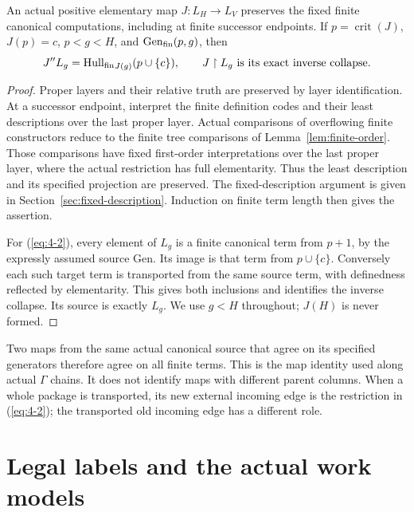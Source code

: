 \begin{lemma}\label{lem:transport}
An actual positive elementary map $J:L_H\to L_V$ preserves the fixed
finite canonical computations, including at finite successor endpoints.
If $p=\operatorname{crit}(J)$, $J(p)=c$, $p<g<H$, and $\operatorname{Gen_{fin}}(p,g)$,
then
\begin{equation}\label{eq:4-2}
 J''L_g=\operatorname{Hull_{fin}}_{J(g)}(p\cup\{c\}),
 \qquad J\restriction L_g\text{ is its exact inverse collapse}.
\end{equation}
\end{lemma}
\begin{proof}
Proper layers and their relative truth are preserved by layer
identification. At a successor endpoint, interpret the finite
definition codes and their least descriptions over the last proper
layer. Actual comparisons of overflowing finite constructors reduce
to the finite tree comparisons of Lemma~\ref{lem:finite-order}.
Those comparisons have fixed first-order interpretations over the
last proper layer, where the actual restriction has full
elementarity. Thus the least description and its specified projection
are preserved. The fixed-description argument is given in
Section~\ref{sec:fixed-description}. Induction on finite term length
then gives the assertion.

For (\ref{eq:4-2}), every element of $L_g$ is a finite canonical term from
$p+1$, by the expressly assumed source Gen. Its image is that term
from $p\cup\{c\}$. Conversely each such target term is transported
from the same source term, with definedness reflected by
elementarity. This gives both inclusions and identifies the inverse
collapse. Its source is exactly $L_g$. We use $g<H$ throughout;
$J(H)$ is never formed. 
\end{proof}

Two maps from the same actual canonical source that agree on its
specified generators therefore agree on all finite terms. This is
the map identity used along actual $\Gamma$ chains. It does not
identify maps with different parent columns. When a whole package
is transported, its new external incoming edge is the restriction
in (\ref{eq:4-2}); the transported old incoming edge has a different role.



\section{Legal labels and the actual work models}\label{ch:models}

